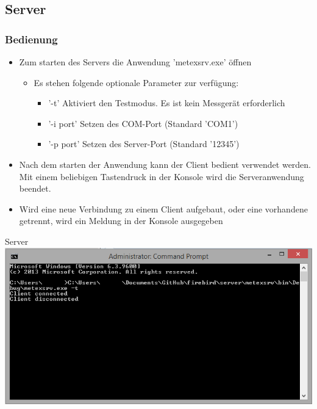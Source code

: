 \documentclass[11pt]{scrartcl}
\begin{document}
\subsection{Server}

\subsubsection{Bedienung}

\begin{itemize}
	\item Zum starten des Servers die Anwendung 'metexsrv.exe' \"offnen
	\begin{itemize}
		\item Es stehen folgende optionale Parameter zur verf\"ugung:
		\begin{itemize}
			\item '-t' Aktiviert den Testmodus. Es ist kein Messger\"at erforderlich
			\item '-i port' Setzen des COM-Port (Standard 'COM1')
			\item '-p port' Setzen des Server-Port (Standard '12345')
		\end{itemize}
	\end{itemize}
	\item Nach dem starten der Anwendung kann der Client bedient verwendet werden.      Mit einem beliebigen Tastendruck in der Konsole wird die Serveranwendung beendet.
	\item Wird eine neue Verbindung zu einem Client aufgebaut, oder eine vorhandene getrennt, wird ein Meldung in der Konsole ausgegeben
\end{itemize}

Server \\

\includegraphics[width=\textwidth]{Konsole}
\end{document}
